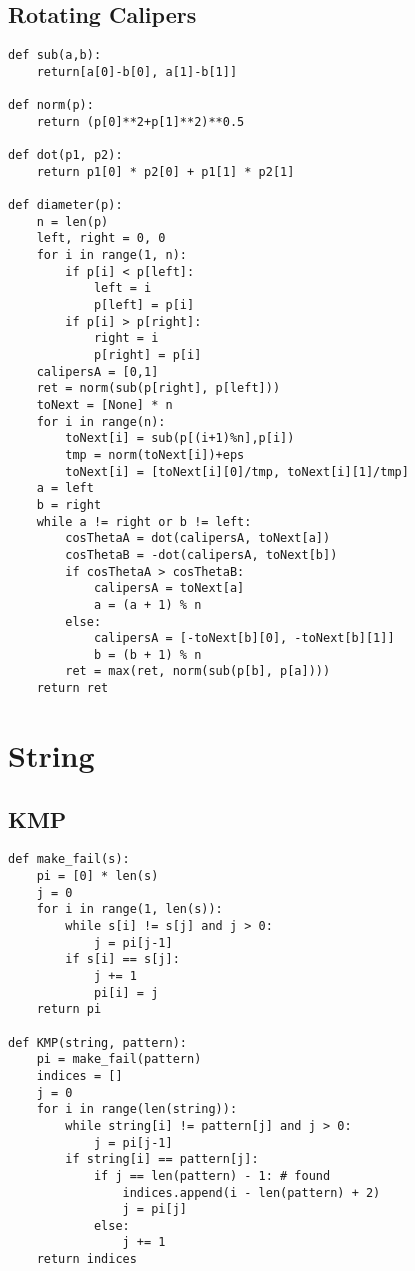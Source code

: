 \documentclass[landscape, 8pt, a4paper, oneside, twocolumn]{extarticle}
\begin{document}
\subsection{Rotating Calipers}
\begin{verbatim}
def sub(a,b):
    return[a[0]-b[0], a[1]-b[1]]

def norm(p):
    return (p[0]**2+p[1]**2)**0.5

def dot(p1, p2):
    return p1[0] * p2[0] + p1[1] * p2[1]

def diameter(p):
    n = len(p)
    left, right = 0, 0
    for i in range(1, n):
        if p[i] < p[left]:
            left = i
            p[left] = p[i]
        if p[i] > p[right]:
            right = i
            p[right] = p[i]
    calipersA = [0,1]
    ret = norm(sub(p[right], p[left]))
    toNext = [None] * n
    for i in range(n):
        toNext[i] = sub(p[(i+1)%n],p[i])
        tmp = norm(toNext[i])+eps
        toNext[i] = [toNext[i][0]/tmp, toNext[i][1]/tmp]
    a = left
    b = right
    while a != right or b != left:
        cosThetaA = dot(calipersA, toNext[a])
        cosThetaB = -dot(calipersA, toNext[b])
        if cosThetaA > cosThetaB:
            calipersA = toNext[a]
            a = (a + 1) % n
        else:
            calipersA = [-toNext[b][0], -toNext[b][1]]
            b = (b + 1) % n
        ret = max(ret, norm(sub(p[b], p[a])))
    return ret
\end{verbatim}
\section{String}
\subsection{KMP}
\begin{verbatim}
def make_fail(s):
    pi = [0] * len(s)
    j = 0
    for i in range(1, len(s)):
        while s[i] != s[j] and j > 0:
            j = pi[j-1]
        if s[i] == s[j]:
            j += 1
            pi[i] = j
    return pi

def KMP(string, pattern):
    pi = make_fail(pattern)
    indices = []
    j = 0
    for i in range(len(string)):
        while string[i] != pattern[j] and j > 0:
            j = pi[j-1]
        if string[i] == pattern[j]:
            if j == len(pattern) - 1: # found
                indices.append(i - len(pattern) + 2)
                j = pi[j]
            else:
                j += 1
    return indices
\end{verbatim}
\end{document}
